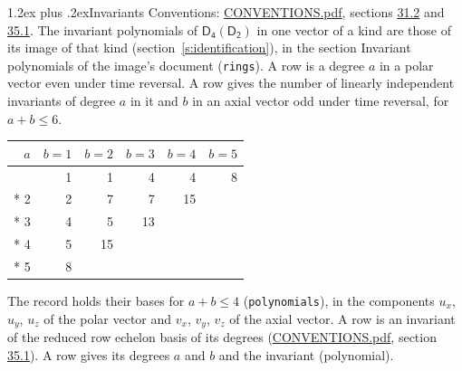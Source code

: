 \documentclass[10pt,a4paper]{article}
\makeatletter
\renewcommand\section{\@startsection{section}{1}{\z@}{-3ex plus -1ex minus -.2ex}%
  {1.2ex plus .2ex}{\normalfont\large\sffamily\bfseries\color{parttitle}}}
\numberwithin{equation}{section}
\newcommand{\grp}[1]{\mathsf{#1}}
\makeatother
\begin{document}
\section{Invariants}\label{s:invariants}
Conventions: \href{../../CONVENTIONS.pdf}{CONVENTIONS.pdf}, sections \href{../../CONVENTIONS.pdf\#conv.31.2}{31.2} and \href{../../CONVENTIONS.pdf\#conv.35.1}{35.1}.
The invariant polynomials of $\grp{D_{4}}(\grp{D_{2}})$ in one vector of a kind are those of its image of that kind (section~\ref{s:identification}), in the section Invariant polynomials of the image's document (\texttt{rings}).
\leavevmode\label{n:index.degree.polar}\label{n:index.degree.axial}A row is a degree $a$ in a polar vector even under time reversal. A row gives the number of linearly independent invariants of degree $a$ in it and $b$ in an axial vector odd under time reversal, for $a + b \le 6$.
{\small\begin{longtable}{@{}rrrrrr@{}}\toprule
$a$ & $b = 1$ & $b = 2$ & $b = 3$ & $b = 4$ & $b = 5$\\\midrule\endhead
\bottomrule\endfoot\endlastfoot
1 & 1 & 1 & 4 & 4 & 8\\*
2 & 2 & 7 & 7 & 15 & \\*
3 & 4 & 5 & 13 &  & \\*
4 & 5 & 15 &  &  & \\*
5 & 8 &  &  &  & \\
\bottomrule\end{longtable}}
\leavevmode\label{n:local.component.polar}\label{n:local.component.axial}The record holds their bases for $a + b \le 4$ (\texttt{polynomials}), in the components $u_{x}$, $u_{y}$, $u_{z}$ of the polar vector and $v_{x}$, $v_{y}$, $v_{z}$ of the axial vector. \label{n:head.polynomial}A row is an invariant of the reduced row echelon basis of its degrees (\href{../../CONVENTIONS.pdf}{CONVENTIONS.pdf}, section \href{../../CONVENTIONS.pdf\#conv.35.1}{35.1}). A row gives its degrees $a$ and $b$ and the invariant (polynomial).
\end{document}
